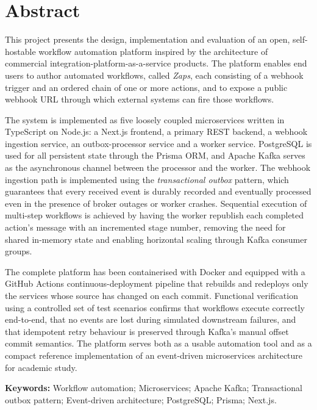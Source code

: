 \documentclass[12pt, a4paper, oneside]{report}
\begin{document}
\chapter*{Abstract}
\thispagestyle{plain}
{

This project presents the design, implementation and evaluation of an open, self-hostable workflow automation platform inspired by the architecture of commercial integration-platform-as-a-service products. The platform enables end users to author automated workflows, called \emph{Zaps}, each consisting of a webhook trigger and an ordered chain of one or more actions, and to expose a public webhook URL through which external systems can fire those workflows.

The system is implemented as five loosely coupled microservices written in TypeScript on Node.js: a Next.js frontend, a primary REST backend, a webhook ingestion service, an outbox-processor service and a worker service. PostgreSQL is used for all persistent state through the Prisma ORM, and Apache Kafka serves as the asynchronous channel between the processor and the worker. The webhook ingestion path is implemented using the \emph{transactional outbox} pattern, which guarantees that every received event is durably recorded and eventually processed even in the presence of broker outages or worker crashes. Sequential execution of multi-step workflows is achieved by having the worker republish each completed action's message with an incremented stage number, removing the need for shared in-memory state and enabling horizontal scaling through Kafka consumer groups.

The complete platform has been containerised with Docker and equipped with a GitHub Actions continuous-deployment pipeline that rebuilds and redeploys only the services whose source has changed on each commit. Functional verification using a controlled set of test scenarios confirms that workflows execute correctly end-to-end, that no events are lost during simulated downstream failures, and that idempotent retry behaviour is preserved through Kafka's manual offset commit semantics. The platform serves both as a usable automation tool and as a compact reference implementation of an event-driven microservices architecture for academic study.

\vspace{0.3cm}

\noindent\textbf{Keywords:} Workflow automation; Microservices; Apache Kafka; Transactional outbox pattern; Event-driven architecture; PostgreSQL; Prisma; Next.js.
}%
\end{document}
